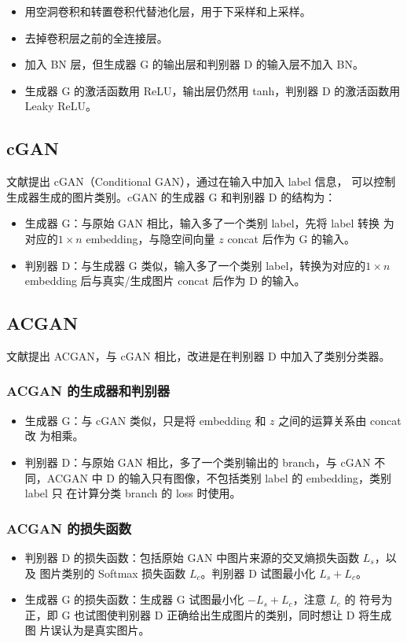 \begin{itemize}
  \item 用空洞卷积和转置卷积代替池化层，用于下采样和上采样。
  \item 去掉卷积层之前的全连接层。
  \item 加入 BN 层，但生成器 G 的输出层和判别器 D 的输入层不加入 BN。
  \item 生成器 G 的激活函数用 ReLU，输出层仍然用 tanh，判别器 D 的激活函数用
    Leaky ReLU。
\end{itemize}

\subsection{cGAN}
文献提出 cGAN（Conditional GAN），通过在输入中加入 label 信息，
可以控制生成器生成的图片类别。cGAN 的生成器 G 和判别器 D 的结构为：

\begin{itemize}
  \item 生成器 G：与原始 GAN 相比，输入多了一个类别 label，先将 label 转换
    为对应的$1 \times n$ embedding，与隐空间向量 $z$ concat 后作为 G 的输入。
  \item 判别器 D：与生成器 G 类似，输入多了一个类别 label，转换为对应的$1 \times
    n$ embedding 后与真实/生成图片 concat 后作为 D 的输入。
\end{itemize}

\subsection{ACGAN}
文献提出 ACGAN，与 cGAN 相比，改进是在判别器 D 中加入了类别分类器。

\subsubsection{ACGAN 的生成器和判别器}
\begin{itemize}
  \item 生成器 G：与 cGAN 类似，只是将 embedding 和 $z$ 之间的运算关系由 concat 改
    为相乘。
  \item 判别器 D：与原始 GAN 相比，多了一个类别输出的 branch，与 cGAN 不
    同，ACGAN 中 D 的输入只有图像，不包括类别 label 的 embedding，类别 label 只
    在计算分类 branch 的 loss 时使用。
\end{itemize}

\subsubsection{ACGAN 的损失函数}
\begin{itemize}
  \item 判别器 D 的损失函数：包括原始 GAN 中图片来源的交叉熵损失函数 $L_{s}$，以及
    图片类别的 Softmax 损失函数 $L_{c}$。判别器 D 试图最小化 $L_{s} + L_{c}$。
  \item 生成器 G 的损失函数：生成器 G 试图最小化 $-L_{s} + L_{c}$，注意 $L_{c}$ 的
    符号为正，即 G 也试图使判别器 D 正确给出生成图片的类别，同时想让 D 将生成图
    片误认为是真实图片。
\end{itemize}

